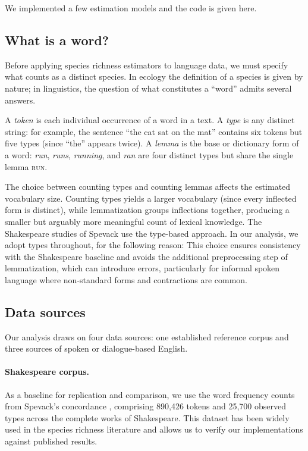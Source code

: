 \documentclass{article}
\begin{document}
We implemented a few estimation models and the code is given here.\\

\subsection{What is a word?}

Before applying species richness estimators to language data, we must specify what counts as a distinct species. In ecology the definition of a species is given by nature; in linguistics, the question of what constitutes a ``word'' admits several answers.

A \emph{token} is each individual occurrence of a word in a text. A \emph{type} is any distinct string: for example, the sentence ``the cat sat on the mat'' contains six tokens but five types (since ``the'' appears twice). A \emph{lemma} is the base or dictionary form of a word: \emph{run}, \emph{runs}, \emph{running}, and \emph{ran} are four distinct types but share the single lemma \textsc{run}.

The choice between counting types and counting lemmas affects the estimated vocabulary size. Counting types yields a larger vocabulary (since every inflected form is distinct), while lemmatization groups inflections together, producing a smaller but arguably more meaningful count of lexical knowledge. The Shakespeare studies of Spevack \cite{Spevack1968} use the type-based approach. In our analysis, we adopt types throughout, for the following reason: This choice ensures consistency with the Shakespeare baseline and avoids the additional preprocessing step of lemmatization, which can introduce errors, particularly for informal spoken language where non-standard forms and contractions are common.

\subsection{Data sources}

Our analysis draws on four data sources: one established reference corpus 
and three sources of spoken or dialogue-based English.

\paragraph{Shakespeare corpus.} As a baseline for replication and 
comparison, we use the word frequency counts from Spevack's concordance 
\cite{Spevack1968}, comprising 890,426 tokens and 25,700 observed types 
across the complete works of Shakespeare. This dataset has been widely used 
in the species richness literature 
\cite{BalabdaouiKulagina2020, CheeWang2016} and allows us to verify our 
implementations against published results.
\end{document}
